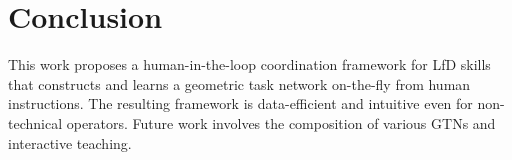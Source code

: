 \section{Conclusion} \label{sec:conclusion}

This work proposes a human-in-the-loop coordination framework for LfD skills that
constructs and learns a geometric task network on-the-fly from human instructions.
The resulting framework is data-efficient and intuitive even for non-technical operators.  
Future work involves the composition of various GTNs and interactive teaching.
